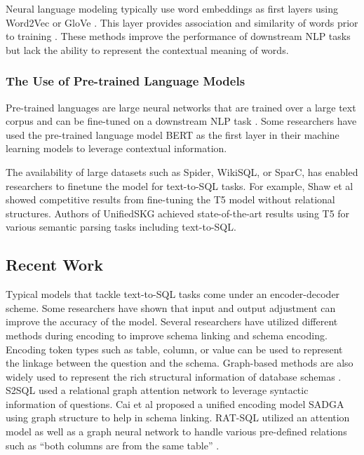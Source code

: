 \documentclass[conference]{IEEEtran}
\begin{document}
Neural language modeling typically use word embeddings as first layers \cite{Mellah2021SQLNetworks,Zhong2017Seq2SQL:Learning, Ferreira2020EvaluatingSystems,Vathsala2021NLP2SQLLearning,Xu2017SQLNet:Learning} using Word2Vec or GloVe \cite{Pennington2014GloVe:Representation}. This layer provides association and similarity of words prior to training \cite{Wong2021ASystems}. These methods improve the performance of downstream NLP tasks but lack the ability to represent the contextual meaning of words\cite{Wang2022Pre-TrainedApplications}.

\subsubsection{The Use of Pre-trained Language Models}

Pre-trained languages are large neural networks that are trained over a large text corpus and can be fine-tuned on a downstream NLP task \cite{Elazar2021MeasuringModels}. Some researchers have used the pre-trained language model BERT \cite{Devlin2018BERT:Understanding} as the first layer in their machine learning models \cite{Hwang2019AContextualization,Guo2019TowardsRepresentation,Zhang2019Editing-BasedQuestions,Li2020AModel,Ma2020MentionGeneration,Cai2021SADGA:Text-to-SQL,Cao2021LGESQL:Relations,Wang2019RAT-SQL:Parsers,Choi2020RYANSQL:Databases,Lin2020BridgingParsing} to leverage contextual information.

The availability of large datasets such as Spider, WikiSQL, or SparC, has enabled researchers to finetune the model for text-to-SQL tasks. For example, Shaw et al \cite{Shaw2020CompositionalBoth} showed competitive results from fine-tuning the T5 model without relational structures. Authors of UnifiedSKG \cite{Xie2022UnifiedSKG:Models} achieved state-of-the-art results using T5 for various semantic parsing tasks including text-to-SQL.

\subsection{Recent Work} 

Typical models that tackle text-to-SQL tasks come under an encoder-decoder scheme. Some researchers have shown that input and output adjustment can improve the accuracy of the model\cite{Wong2021ASystems}. Several researchers have utilized different methods during encoding to improve schema linking and schema encoding. Encoding token types \cite{Guo2019ContentGeneration,Brunner2021ValueNet:Information} such as table, column, or value can be used to represent the linkage between the question and the schema. Graph-based methods are also widely used to represent the rich structural information of database schemas \cite{Deng2022RecentExpect}. S2SQL \cite{Hui2022S2SQL:Parsers} used a relational graph attention network to leverage syntactic information of questions. Cai et al proposed a unified encoding model SADGA \cite{Cai2021SADGA:Text-to-SQL} using graph structure to help in schema linking.  RAT-SQL \cite{Wang2019RAT-SQL:Parsers} utilized an attention model as well as a graph neural network to handle various pre-defined relations such as “both columns are from the same table” \cite{Deng2022RecentExpect}.
\end{document}
